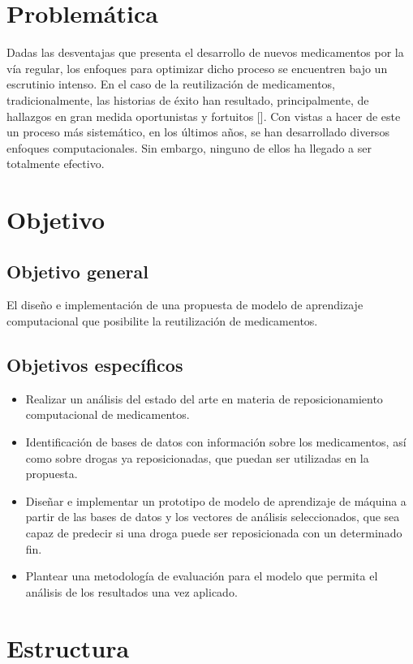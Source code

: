 \section*{Problemática}
Dadas las desventajas que presenta el desarrollo de nuevos medicamentos por la vía regular, los enfoques para optimizar dicho proceso se encuentren bajo un escrutinio intenso. En el caso de la reutilización de medicamentos, tradicionalmente, las historias de éxito han resultado, principalmente, de hallazgos en gran medida oportunistas y fortuitos [\cite{drugfindings}]. Con vistas a hacer de este un proceso más sistemático, en los últimos años, se han desarrollado diversos enfoques computacionales. Sin embargo, ninguno de ellos ha llegado a ser totalmente efectivo. 

\section*{Objetivo}
\subsection*{Objetivo general}
El diseño e implementación de una propuesta de modelo de aprendizaje computacional que posibilite la reutilización de medicamentos. 

\subsection*{Objetivos específicos}

\begin{itemize}
    \item Realizar un análisis del estado del arte en materia de reposicionamiento computacional de medicamentos.
    \item Identificación de bases de datos con información sobre los medicamentos, así como sobre drogas ya reposicionadas, que puedan ser utilizadas en la propuesta.
    \item Diseñar e implementar un prototipo de modelo de aprendizaje de máquina a partir de las bases de datos y los vectores de análisis seleccionados, que sea capaz de predecir si una droga puede ser reposicionada con un determinado fin.
    \item Plantear una metodología de evaluación para el modelo que permita el análisis de los resultados una vez aplicado.
\end{itemize}

\section*{Estructura}